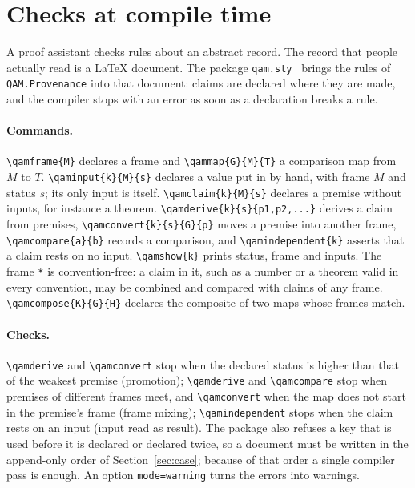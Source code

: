 \section{Checks at compile time}\label{sec:tex}

A proof assistant checks rules about an abstract record.  The record that people actually read is a \LaTeX{} document.  The package
\texttt{qam.sty}~\cite{repo} brings the rules of \texttt{QAM.Provenance} into that document: claims are declared where they are made,
and the compiler stops with an error as soon as a declaration breaks a rule.

{\sloppy\paragraph{Commands.}  \verb|\qamframe{M}| declares a frame and \verb|\qammap{G}{M}{T}| a comparison map from \(M\) to \(T\).
\verb|\qaminput{k}{M}{s}| declares a value put in by hand, with frame \(M\) and status \(s\); its only input is itself.
\verb|\qamclaim{k}{M}{s}| declares a premise without inputs, for instance a theorem.  \verb|\qamderive{k}{s}{p1,p2,...}| derives a claim
from premises, \verb|\qamconvert{k}{s}{G}{p}| moves a premise into another frame, \verb|\qamcompare{a}{b}| records a comparison, and
\verb|\qamindependent{k}| asserts that a claim rests on no input.  \verb|\qamshow{k}| prints status, frame and inputs.  The frame
\verb|*| is convention-free: a claim in it, such as a number or a theorem valid in every convention, may be combined and compared with
claims of any frame.  \verb|\qamcompose{K}{G}{H}| declares the composite of two maps whose frames match.\par}

\paragraph{Checks.}  \verb|\qamderive| and \verb|\qamconvert| stop when the declared status is higher than that of the weakest premise
(promotion); \verb|\qamderive| and \verb|\qamcompare| stop when premises of different frames meet, and \verb|\qamconvert| when the map does
not start in the premise's frame (frame mixing); \verb|\qamindependent| stops when the claim rests on an input (input read as result).  The
package also refuses a key that is used before it is declared or declared twice, so a document must be written in the append-only order
of Section~\ref{sec:case}; because of that order a single compiler pass is enough.  An option \verb|mode=warning| turns the errors into
warnings.

